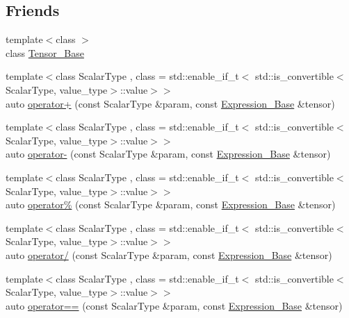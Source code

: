\subsection*{Friends}
\begin{DoxyCompactItemize}
\item 
{\footnotesize template$<$class $>$ }\\class \hyperlink{classbc_1_1tensors_1_1Expression__Base_a794d203bce037da65d945527a3fe4837}{Tensor\+\_\+\+Base}
\item 
{\footnotesize template$<$class Scalar\+Type , class  = std\+::enable\+\_\+if\+\_\+t$<$   std\+::is\+\_\+convertible$<$\+Scalar\+Type, value\+\_\+type$>$\+::value$>$$>$ }\\auto \hyperlink{classbc_1_1tensors_1_1Expression__Base_aca6a969e8c10f3e2d08c61d0d6f8358c}{operator+} (const Scalar\+Type \&param, const \hyperlink{classbc_1_1tensors_1_1Expression__Base}{Expression\+\_\+\+Base} \&tensor)
\item 
{\footnotesize template$<$class Scalar\+Type , class  = std\+::enable\+\_\+if\+\_\+t$<$   std\+::is\+\_\+convertible$<$\+Scalar\+Type, value\+\_\+type$>$\+::value$>$$>$ }\\auto \hyperlink{classbc_1_1tensors_1_1Expression__Base_a0b24e407f0e9159f71948e51590e13ee}{operator-\/} (const Scalar\+Type \&param, const \hyperlink{classbc_1_1tensors_1_1Expression__Base}{Expression\+\_\+\+Base} \&tensor)
\item 
{\footnotesize template$<$class Scalar\+Type , class  = std\+::enable\+\_\+if\+\_\+t$<$   std\+::is\+\_\+convertible$<$\+Scalar\+Type, value\+\_\+type$>$\+::value$>$$>$ }\\auto \hyperlink{classbc_1_1tensors_1_1Expression__Base_ad6b9d5f43e904cd9c7e61a897644ecd4}{operator\%} (const Scalar\+Type \&param, const \hyperlink{classbc_1_1tensors_1_1Expression__Base}{Expression\+\_\+\+Base} \&tensor)
\item 
{\footnotesize template$<$class Scalar\+Type , class  = std\+::enable\+\_\+if\+\_\+t$<$   std\+::is\+\_\+convertible$<$\+Scalar\+Type, value\+\_\+type$>$\+::value$>$$>$ }\\auto \hyperlink{classbc_1_1tensors_1_1Expression__Base_af8670bbeb905e7727156970ec95604df}{operator/} (const Scalar\+Type \&param, const \hyperlink{classbc_1_1tensors_1_1Expression__Base}{Expression\+\_\+\+Base} \&tensor)
\item 
{\footnotesize template$<$class Scalar\+Type , class  = std\+::enable\+\_\+if\+\_\+t$<$   std\+::is\+\_\+convertible$<$\+Scalar\+Type, value\+\_\+type$>$\+::value$>$$>$ }\\auto \hyperlink{classbc_1_1tensors_1_1Expression__Base_a40bd65b31a908496df2f3be539ca4dc0}{operator==} (const Scalar\+Type \&param, const \hyperlink{classbc_1_1tensors_1_1Expression__Base}{Expression\+\_\+\+Base} \&tensor)

\end{DoxyCompactItemize}
